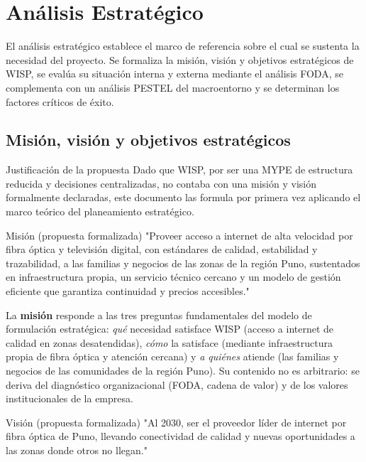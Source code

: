 \section{Análisis Estratégico}
\label{sec:estrategico}

El análisis estratégico establece el marco de referencia sobre el cual se sustenta
la necesidad del proyecto. Se formaliza la misión, visión y objetivos estratégicos
de WISP, se evalúa su situación interna y externa mediante el análisis FODA, se
complementa con un análisis PESTEL del macroentorno y se determinan los factores
críticos de éxito.

\subsection{Misión, visión y objetivos estratégicos}

\begin{upeubox}{Justificación de la propuesta}
Dado que WISP, por ser una MYPE de estructura reducida y decisiones
centralizadas, no contaba con una misión y visión formalmente declaradas,
este documento las formula por primera vez aplicando el marco teórico del
planeamiento estratégico.
\end{upeubox}

\begin{upeubox}{Misión (propuesta formalizada)}
"Proveer acceso a internet de alta velocidad por fibra óptica y televisión digital,
con estándares de calidad, estabilidad y trazabilidad, a las familias y negocios
de las zonas de la región Puno, sustentados en infraestructura propia,
un servicio técnico cercano y un modelo de gestión eficiente que garantiza
continuidad y precios accesibles."
\end{upeubox}

La \textbf{misión} responde a las tres preguntas fundamentales del modelo de
formulación estratégica: \emph{qué} necesidad satisface WISP (acceso a internet
de calidad en zonas desatendidas), \emph{cómo} la satisface (mediante
infraestructura propia de fibra óptica y atención cercana) y \emph{a quiénes}
atiende (las familias y negocios de las comunidades de la región Puno). Su
contenido no es arbitrario: se deriva del diagnóstico organizacional (FODA,
cadena de valor) y de los valores institucionales de la empresa.

\begin{upeubox}{Visión (propuesta formalizada)}
"Al 2030, ser el proveedor líder de internet por fibra óptica de Puno,
llevando conectividad de calidad y nuevas oportunidades a las zonas donde otros no llegan."
\end{upeubox}

